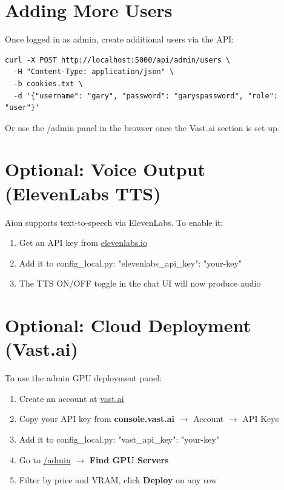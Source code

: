 \documentclass[11pt,a4paper]{article}
\newcommand{\code}[1]{{\ttfamily\small\color{navy}#1}}
\begin{document}
\section{Adding More Users}

Once logged in as admin, create additional users via the API:

\begin{lstlisting}
curl -X POST http://localhost:5000/api/admin/users \
  -H "Content-Type: application/json" \
  -b cookies.txt \
  -d '{"username": "gary", "password": "garyspassword", "role": "user"}'
\end{lstlisting}

Or use the \code{/admin} panel in the browser once the Vast.ai section is set up.

\section{Optional: Voice Output (ElevenLabs TTS)}

Aion supports text-to-speech via ElevenLabs. To enable it:

\begin{enumerate}[leftmargin=1.4em, itemsep=2pt]
  \item Get an API key from \href{https://elevenlabs.io}{elevenlabs.io}
  \item Add it to \code{config\_local.py}: \code{"elevenlabs\_api\_key": "your-key"}
  \item The TTS ON/OFF toggle in the chat UI will now produce audio
\end{enumerate}

\section{Optional: Cloud Deployment (Vast.ai)}

To use the admin GPU deployment panel:

\begin{enumerate}[leftmargin=1.4em, itemsep=2pt]
  \item Create an account at \href{https://vast.ai}{vast.ai}
  \item Copy your API key from \textbf{console.vast.ai} $\to$ Account $\to$ API Keys
  \item Add it to \code{config\_local.py}: \code{"vast\_api\_key": "your-key"}
  \item Go to \href{http://localhost:5000/admin}{\code{/admin}} $\to$ \textbf{Find GPU Servers}
  \item Filter by price and VRAM, click \textbf{Deploy} on any row
\end{enumerate}
\end{document}
